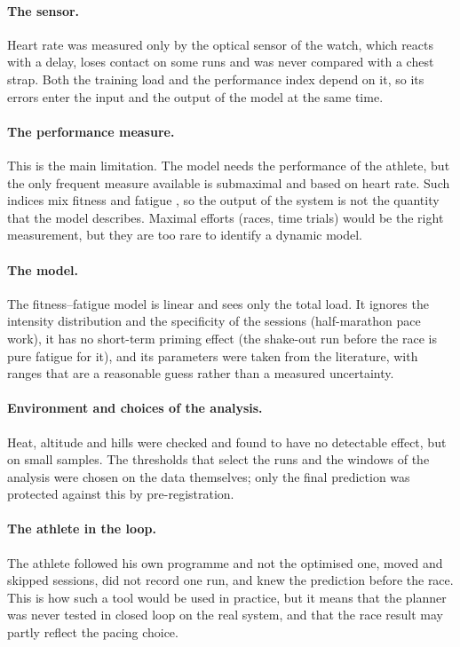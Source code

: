 \documentclass[11pt,a4paper]{article}
\begin{document}
\paragraph{The sensor.} Heart rate was measured only by the optical sensor of the
watch, which reacts with a delay, loses contact on some runs and was never
compared with a chest strap. Both the training load and the performance index
depend on it, so its errors enter the input and the output of the model at the
same time.

\paragraph{The performance measure.} This is the main limitation. The model needs
the performance of the athlete, but the only frequent measure available is
submaximal and based on heart rate. Such indices mix fitness and fatigue
\citep{bosquet2008}, so the output of the system is not the quantity that the
model describes. Maximal efforts (races, time trials) would be the right
measurement, but they are too rare to identify a dynamic model.

\paragraph{The model.} The fitness--fatigue model is linear and sees only the
total load. It ignores the intensity distribution and the specificity of the
sessions (half-marathon pace work), it has no short-term priming effect (the
shake-out run before the race is pure fatigue for it), and its parameters were
taken from the literature, with ranges that are a reasonable guess rather than
a measured uncertainty.

\paragraph{Environment and choices of the analysis.} Heat, altitude and hills
were checked and found to have no detectable effect, but on small samples. The
thresholds that select the runs and the windows of the analysis were chosen on
the data themselves; only the final prediction was protected against this by
pre-registration.

\paragraph{The athlete in the loop.} The athlete followed his own programme and
not the optimised one, moved and skipped sessions, did not record one run, and
knew the prediction before the race. This is how such a tool would be used in
practice, but it means that the planner was never tested in closed loop on the
real system, and that the race result may partly reflect the pacing choice.
\end{document}
